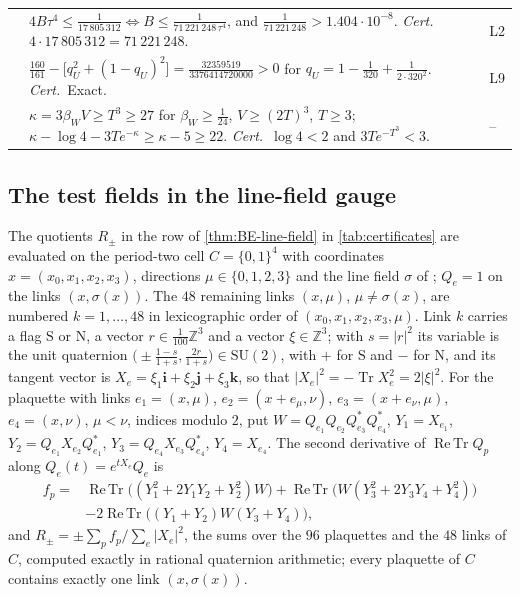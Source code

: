 \documentclass[11pt,a4paper]{amsart}
\theoremstyle{definition}
\theoremstyle{remark}
\numberwithin{equation}{section}
\DeclareMathOperator{\Tr}{Tr}        %
\DeclareMathOperator{\ReTr}{Re\,Tr}  %
\newcommand{\Z}{\mathbb{Z}}          %
\newcommand{\abs}[1]{\lvert #1\rvert}      %
\newcommand{\SU}{\mathrm{SU}}              %
\newcommand{\betaW}{\beta_{W}}             %
\begin{document}
{\begin{longtable}{@{}p{}p{}p{}@{}}
{prop:balaban-constant} & $4B\tau^4\le\frac1{17\,805\,312}\iff B\le\frac1{71\,221\,248\,\tau^4}$, and $\frac1{71\,221\,248}>1.404\cdot10^{-8}$. \emph{Cert.}\ $4\cdot17\,805\,312=71\,221\,248$. & L2\\
\addlinespace
{}{ms:thm:window} & $\frac{160}{161}-\bigl[q_U^2+(1-q_U)^2\bigr]=\frac{32359519}{3376414720000}>0$ for $q_U=1-\frac1{320}+\frac1{2\cdot320^2}$. \emph{Cert.}\ Exact. & L9\\
{ms:prop:window-failure} & $\kappa=3\betaW V\ge T^3\ge27$ for $\betaW\ge\frac1{24}$, $V\ge(2T)^3$, $T\ge3$; $\kappa-\log4-3Te^{-\kappa}\ge\kappa-5\ge22$. \emph{Cert.}\ $\log4<2$ and $3Te^{-T^3}<3$. & --\\
\end{longtable}}

\subsection{The test fields in the line-field gauge}
The quotients $R_\pm$ in the row of \cref{thm:BE-line-field} in \cref{tab:certificates} are evaluated on the period-two cell $C=\{0,1\}^4$ with coordinates $x=(x_0,x_1,x_2,x_3)$, directions $\mu\in\{0,1,2,3\}$ and the line field $\sigma$ of \cite[Table~A1]{bhattacharjee2026first}; $Q_e=1$ on the links $(x,\sigma(x))$. The $48$ remaining links $(x,\mu)$, $\mu\ne\sigma(x)$, are numbered $k=1,\dots,48$ in lexicographic order of $(x_0,x_1,x_2,x_3,\mu)$. Link $k$ carries a flag $\mathrm S$ or $\mathrm N$, a vector $r\in\frac1{100}\Z^3$ and a vector $\xi\in\Z^3$; with $s=\abs r^2$ its variable is the unit quaternion $\bigl(\pm\frac{1-s}{1+s},\frac{2r}{1+s}\bigr)\in\SU(2)$, with $+$ for $\mathrm S$ and $-$ for $\mathrm N$, and its tangent vector is $X_e=\xi_1\mathbf i+\xi_2\mathbf j+\xi_3\mathbf k$, so that $\abs{X_e}^2=-\Tr X_e^2=2\abs\xi^2$. For the plaquette with links $e_1=(x,\mu)$, $e_2=(x+e_\mu,\nu)$, $e_3=(x+e_\nu,\mu)$, $e_4=(x,\nu)$, $\mu<\nu$, indices modulo $2$, put $W=Q_{e_1}Q_{e_2}Q_{e_3}^*Q_{e_4}^*$, $Y_1=X_{e_1}$, $Y_2=Q_{e_1}X_{e_2}Q_{e_1}^*$, $Y_3=Q_{e_4}X_{e_3}Q_{e_4}^*$, $Y_4=X_{e_4}$. The second derivative of $\ReTr Q_p$ along $Q_e(t)=e^{tX_e}Q_e$ is
\begin{align*}
f_p={}&\ReTr\bigl((Y_1^2+2Y_1Y_2+Y_2^2)W\bigr)+\ReTr\bigl(W(Y_3^2+2Y_3Y_4+Y_4^2)\bigr)\\
&-2\ReTr\bigl((Y_1+Y_2)W(Y_3+Y_4)\bigr),
\end{align*}
and $R_\pm=\pm\sum_pf_p/\sum_e\abs{X_e}^2$, the sums over the $96$ plaquettes and the $48$ links of $C$, computed exactly in rational quaternion arithmetic; every plaquette of $C$ contains exactly one link $(x,\sigma(x))$.
\end{document}
